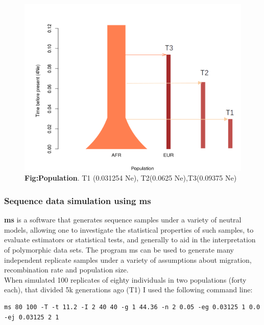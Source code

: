 \begin{figure}[H]
\centering
\includegraphics[width=1.10\textwidth]{fig/populationthreetime.png}
\decoRule
\caption{\textbf{Fig:Population}. 
T1 (0.031254 Ne), T2(0.0625 Ne),T3(0.09375 Ne)}
\label{fig:population.pdf}
\end{figure}

\subsubsection{Sequence data simulation using \textbf{ms}}
\textbf{ms} \cite{hudson2004ms} is a software that generates sequence samples under a variety of neutral models, allowing one to investigate the statistical properties of such samples, to evaluate estimators or statistical tests, and generally to aid in the interpretation of polymorphic data sets. The program ms can be used to generate many independent replicate samples under a variety of assumptions about migration, recombination rate and population size.\\ 

When simulated 100 replicates of eighty individuals in two populations (forty each), that divided 5k generations ago (T1) I used the following command line: 
\begin{verbatim}
ms 80 100 -T -t 11.2 -I 2 40 40 -g 1 44.36 -n 2 0.05 -eg 0.03125 1 0.0 -ej 0.03125 2 1   
\end{verbatim}


